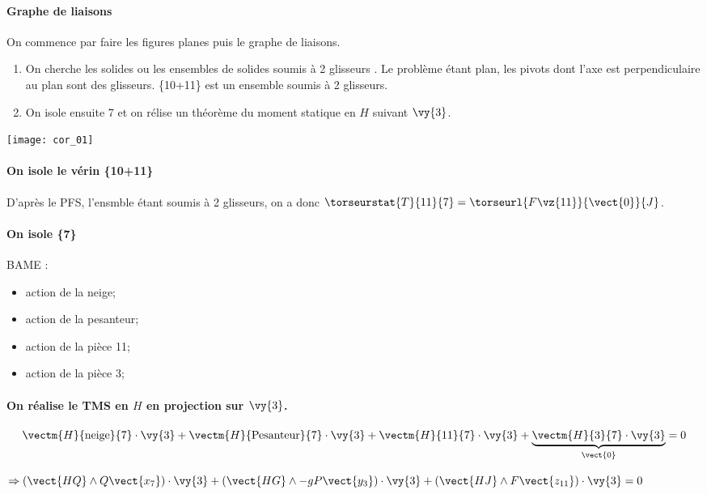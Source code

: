 \ifprof
\begin{corrige}
\paragraph*{Graphe de liaisons}

On commence par faire les figures planes puis le graphe de liaisons.
\begin{enumerate}
\item On cherche les solides ou les ensembles de solides soumis à 2 glisseurs . Le problème étant plan, les pivots dont l'axe est perpendiculaire au plan sont des glisseurs. \{10+11\} est un ensemble soumis à 2 glisseurs.
\item On isole ensuite 7 et on rélise un théorème du moment statique en $H$ suivant $\vy{3}$.
\end{enumerate}

\begin{center}
\texttt{[image: cor\_01]}
\end{center}

\paragraph*{On isole le vérin \{10+11\}}
D'après le PFS, l'ensmble étant soumis à 2 glisseurs, on a donc $\torseurstat{T}{11}{7} = \torseurl{F\vz{11}}{\vect{0}}{J}$.

\paragraph*{On isole \{7\}}
BAME : 
\begin{itemize}
\item action de la neige;
\item action de la pesanteur;
\item action de la pièce 11;
\item action de la pièce 3;
\end{itemize}

\paragraph*{On réalise le TMS en $H$ en projection sur $\vy{3}$.}

$$
\vectm{H}{\text{neige}}{7} \cdot \vy{3} + \vectm{H}{\text{Pesanteur}}{7} \cdot \vy{3} + \vectm{H}{11}{7} \cdot \vy{3} + \underbrace{\vectm{H}{3}{7} \cdot \vy{3}}_{\vect{0}} =0
$$

$
\Rightarrow
\left(\vect{HQ}\wedge Q\vect{x_7} \right) \cdot \vy{3} 
+ \left(\vect{HG}\wedge -gP\vect{y_3} \right) \cdot \vy{3} 
+ \left(\vect{HJ}\wedge F\vect{z_{11}} \right)  \cdot \vy{3}=0
$


\end{corrige}
